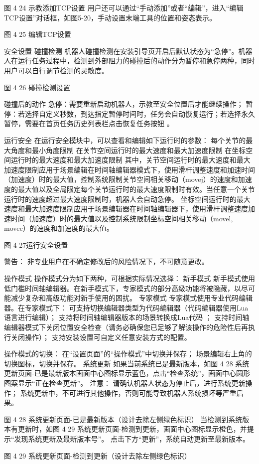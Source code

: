 图 4 24 示教添加TCP设置
用户还可以通过“手动添加”或者“编辑”，进入“编辑TCP设置”对话框，如图5-20，手动设置末端工具的位置和姿态表示。

图 4 25  编辑TCP设置

安全设置
碰撞检测
机器人碰撞检测在安装引导页开启后默认状态为“急停”。机器人在运行任务过程中，检测到外部阻力的碰撞后的动作分为暂停和急停两种，同时用户可以自行调节检测的灵敏度。


图 4 26 碰撞检测设置

碰撞后的动作
急停：需要重新启动机器人，示教至安全位置后才能继续操作；
暂停：若选择自定义秒数，到达指定暂停时间时，任务会自动恢复运行；若选择永久暂停，需要在首页任务历史列表栏点击恢复任务按钮 。

运行安全
在运行安全模块中，可以查看和编辑如下运行时的参数：
每个关节的最大角度和最小角度限制
在关节空间运行时的最大速度和最大加速度限制
在坐标空间运行时的最大速度和最大加速度限制
其中，关节空间运行时的最大速度和最大加速度限制应用于场景编辑在时间轴编辑器模式下，使用滑杆调整速度和加速时间（加速度）时的最大值，控制系统限制关节空间相关移动（movej）的速度和加速度的最大值以及全局限定每个关节运行时的最大速度限制时有效。当任意一个关节运行时的速度超过最大速度限制时，机器人会自动急停。
坐标空间运行时的最大速度和最大加速度限制应用于场景编辑器在时间轴编辑器下，使用滑杆调整速度加速时间（加速度）时的最大值以及控制系统限制坐标空间相关移动（movel, movec）的速度和加速度的最大值。


图 4 27运行安全设置

 	警告：
非专业用户在不确定修改后的风险情况下，不可随意更改。

操作模式
操作模式分为如下两种，可根据实际情况选择：
新手模式
新手模式使用低门槛时间轴编辑器。在新手模式下，专家模式的部分高级功能将被隐藏，以尽可能减少复杂和高级功能对新手使用的困扰。
专家模式
专家模式使用专业代码编辑器。在专家模式下：
可支持切换编辑器类型为代码编辑器（代码编辑器使用Lua语言进行编辑）；
支持将时间轴编辑器版本的场景转换成Lua代码 ；
支持时间轴编辑器模式下关闭位置安全检查（请务必确保您已足够了解该操作的危险性后再执行关闭操作）；
支持安装设置可自定义任意安装方式的配置。

操作模式的切换：
在“设置页面”的“操作模式”中切换并保存；
场景编辑右上角的切换图标，切换并保存。
系统更新
如果当前系统已是最新版本，如图 4 28 系统更新页面-已是最新版本画面中心图标显示蓝色，点击“检查系统”，画面中心圆形图案显示“正在检查更新”。
 	注意：
请确认机器人状态为停止后，进行系统更新操作；
系统更新中，不可进行其他操作，否则可能导致机器人系统损坏等严重后果。

图 4 28 系统更新页面-已是最新版本（设计去除左侧绿色标识）
当检测到系统版本有更新时，如图 4 29 系统更新页面-检测到更新，画面中心图标显示橙色，并提示“发现系统更新及最新版本号”。 点击下方“更新”，系统自动更新至最新版本。

图 4 29 系统更新页面-检测到更新（设计去除左侧绿色标识）
